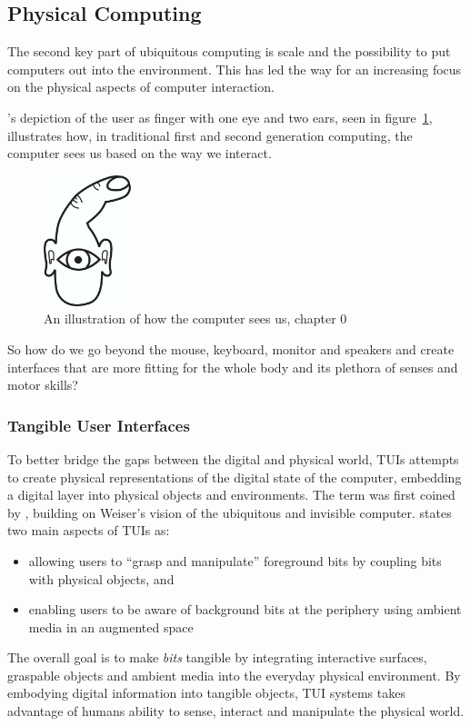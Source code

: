 \subsection{Physical Computing}
\label{interfaces:physical_computing}
The second key part of ubiquitous computing is scale and the possibility to put computers out into the environment.
This has led the way for an increasing focus on the physical aspects of computer interaction.

\citet{o2004physical}'s depiction of the user as finger with one eye and two ears, seen in figure~\ref{finger-eye}, illustrates how, in traditional first and second generation computing, the computer sees us based on the way we interact. 

\begin{figure}[h]
  \centering
      \includegraphics[height=1.5in]{figures/igoefinger}
  \caption[An illustration of how the computer sees us, chapter 0 \citep{o2004physical}]
   {An illustration of how the computer sees us, chapter 0 \citep{o2004physical}}
   \label{finger-eye}
\end{figure}
So how do we go beyond the mouse, keyboard, monitor and speakers and create interfaces that are more fitting for the whole body and its plethora of senses and motor skills? 

\subsubsection{Tangible User Interfaces}
To better bridge the gaps between the digital and physical world, TUIs attempts to create physical representations of the digital state of the computer, embedding a digital layer into physical objects and environments.
The term was first coined by \citet{ishii1997tangible}, building on Weiser's vision of the ubiquitous and invisible computer.
\citeauthor{ishii1997tangible} states two main aspects of TUIs as:
\begin{itemize}
    \item{allowing users to ``grasp and manipulate'' foreground bits by coupling bits with physical objects, and}
    \item{enabling users to be aware of background bits at the periphery using ambient media in an augmented space}
\end{itemize}
The overall goal is to make \emph{bits} tangible by integrating interactive surfaces, graspable objects and ambient media into the everyday physical environment.
By embodying digital information into tangible objects, TUI systems takes advantage of humans ability to sense, interact and manipulate the physical world. 

